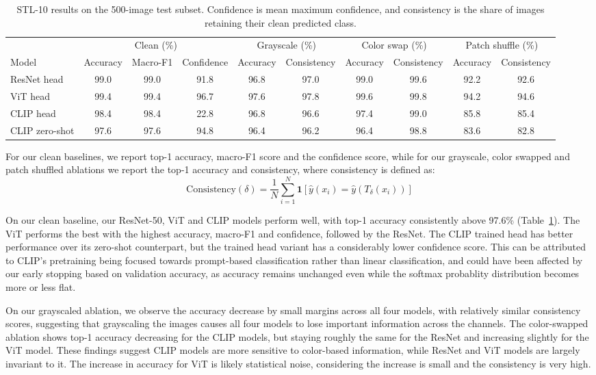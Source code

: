 \documentclass{article}
\begin{document}
\begin{table}[H]
\caption{STL-10 results on the 500-image test subset. Confidence is mean maximum confidence, and consistency is the share of images retaining their clean predicted class.}
\label{tab:t1perf}\centering\scriptsize\setlength{\tabcolsep}{1.5pt}
\begin{tabular}{@{}l*{9}{c}@{}}
\toprule
& \multicolumn{3}{c}{Clean (\%)} & \multicolumn{2}{c}{Grayscale (\%)} & \multicolumn{2}{c}{Color swap (\%)} & \multicolumn{2}{c}{Patch shuffle (\%)}\\
\cmidrule(lr){2-4}\cmidrule(lr){5-6}\cmidrule(lr){7-8}\cmidrule(l){9-10}
Model & Accuracy & Macro-F1 & Confidence & Accuracy & Consistency & Accuracy & Consistency & Accuracy & Consistency\\
\midrule
ResNet head & 99.0 & 99.0 & 91.8 & 96.8 & 97.0 & 99.0 & 99.6 & 92.2 & 92.6\\
ViT head & 99.4 & 99.4 & 96.7 & 97.6 & 97.8 & 99.6 & 99.8 & 94.2 & 94.6\\
CLIP head & 98.4 & 98.4 & 22.8 & 96.8 & 96.6 & 97.4 & 99.0 & 85.8 & 85.4\\
CLIP zero-shot & 97.6 & 97.6 & 94.8 & 96.4 & 96.2 & 96.4 & 98.8 & 83.6 & 82.8\\
\bottomrule
\end{tabular}
\end{table}

For our clean baselines, we report top-1 accuracy, macro-F1 score and the confidence score, while for our grayscale, color swapped and patch shuffled ablations we report the top-1 accuracy and consistency, where consistency is defined as:
\[
\text{Consistency}(\delta) = \frac{1}{N} \sum_{i=1}^{N} \mathbf{1}[\hat{y}(x_i) = \hat{y}(T_{\delta}(x_i))]
\]

On our clean baseline, our ResNet-50, ViT and CLIP models perform well, with top-1 accuracy consistently above 97.6\% (Table~\ref{tab:t1perf}).
The ViT performs the best with the highest accuracy, macro-F1 and confidence, followed by the ResNet. The CLIP trained head has better performance over its zero-shot counterpart, but the trained head variant has a considerably lower confidence score. This can be attributed to CLIP's pretraining being focused towards prompt-based classification rather than linear classification, and could have been affected by our early stopping based on validation accuracy, as accuracy remains unchanged even while the softmax probablity distribution becomes more or less flat.


On our grayscaled ablation, we observe the accuracy decrease by small margins across all four models, with relatively similar consistency scores, suggesting that grayscaling the images causes all four models to lose important information across the channels. The color-swapped ablation shows top-1 accuracy decreasing for the CLIP models, but staying roughly the same for the ResNet and increasing slightly for the ViT model. These findings suggest CLIP models are more sensitive to color-based information, while ResNet and ViT models are largely invariant to it. The increase in accuracy for ViT is likely statistical noise, considering the increase is small and the consistency is very high.
\end{document}
